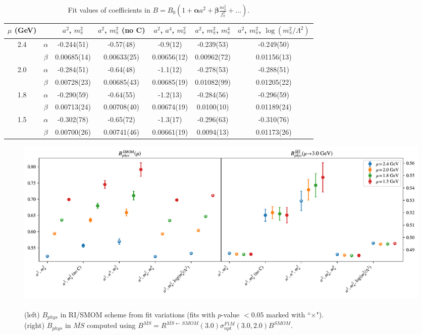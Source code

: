\documentclass[12pt]{extarticle}
\begin{document}
\begin{table}[h!]
\begin{center}
\begin{tabular}{|c c|c|c|c|c|c|}
\hline
$\mu$ (GeV) &  & $a^2$, $m_\pi^2$& $a^2$, $m_\pi^2$ (no C)& $a^2$, $a^4$, $m_\pi^2$& $a^2$, $m_\pi^2$, $m_\pi^4$& $a^2$, $m_\pi^2$, $\log(m_\pi^2/\Lambda^2)$\\
\hline
\multirow{2}{0.5in}{2.4} & $\alpha$ & -0.244(51)& -0.57(48)& -0.9(12)& -0.239(53)& -0.249(50)\\
 & $\beta$ & 0.00685(14)& 0.00633(25)& 0.00656(12)& 0.00962(72)& 0.01156(13)\\
\hline
\multirow{2}{0.5in}{2.0} & $\alpha$ & -0.284(51)& -0.64(48)& -1.1(12)& -0.278(53)& -0.288(51)\\
 & $\beta$ & 0.00728(23)& 0.00685(43)& 0.00685(19)& 0.01082(99)& 0.01205(22)\\
\hline
\multirow{2}{0.5in}{1.8} & $\alpha$ & -0.290(59)& -0.64(55)& -1.2(13)& -0.284(56)& -0.296(59)\\
 & $\beta$ & 0.00713(24)& 0.00708(40)& 0.00674(19)& 0.0100(10)& 0.01189(24)\\
\hline
\multirow{2}{0.5in}{1.5} & $\alpha$ & -0.302(78)& -0.65(72)& -1.3(17)& -0.296(63)& -0.310(76)\\
 & $\beta$ & 0.00700(26)& 0.00741(46)& 0.00661(19)& 0.0094(13)& 0.01173(26)\\
\hline
\end{tabular}
\caption{Fit values of coefficients in $B = B_0(1 + \mathbf{\alpha} a^2 + \mathbf{\beta} \frac{m_\pi^2}{f_\pi^2} + \ldots)$.}
\end{center}
\end{table}
\begin{figure}
\centering
\includegraphics[page=1, width=1.1\textwidth]{plots/TT_fit_summary.pdf}
\caption{\\(left) $B_{phys}$ in RI/SMOM scheme from fit variations (fits with $p$-value $<0.05$ marked with ``$\times$"). \\(right) $B_{phys}$ in $\overline{MS}$ computed using $B^{\overline{MS}} = R^{\overline{MS}\leftarrow SMOM}(3.0)\sigma_{npt}^{F1M}(3.0, 2.0) B^{SMOM}$.}
\end{figure}
\end{document}
